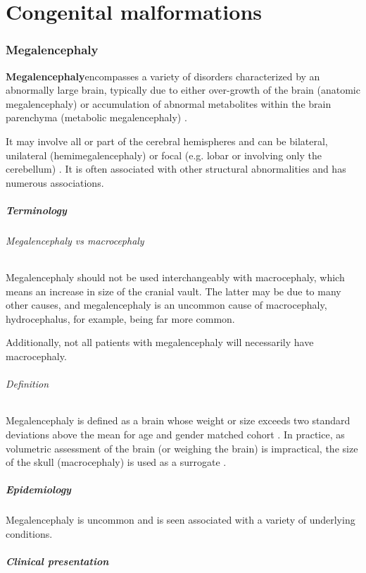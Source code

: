 \chapter{Congenital malformations}

\subsection{Megalencephaly}

\textbf{Megalencephaly}encompasses a variety of disorders characterized by an abnormally large brain, typically due to either over-growth of the brain (anatomic megalencephaly) or accumulation of abnormal metabolites within the brain parenchyma (metabolic megalencephaly) .

It may involve all or part of the cerebral hemispheres and can be bilateral, unilateral (hemimegalencephaly) or focal (e.g. lobar or involving only the cerebellum) . It is often associated with other structural abnormalities and has numerous associations.

\paragraph{Terminology}

\subparagraph{Megalencephaly vs macrocephaly}

Megalencephaly should not be used interchangeably with macrocephaly, which means an increase in size of the cranial vault. The latter may be due to many other causes, and megalencephaly is an uncommon cause of macrocephaly, hydrocephalus, for example, being far more common.

Additionally, not all patients with megalencephaly will necessarily have macrocephaly.

\subparagraph{Definition}

Megalencephaly is defined as a brain whose weight or size exceeds two standard deviations above the mean for age and gender matched cohort . In practice, as volumetric assessment of the brain (or weighing the brain) is impractical, the size of the skull (macrocephaly) is used as a surrogate .

\paragraph{Epidemiology}

Megalencephaly is uncommon and is seen associated with a variety of underlying conditions.

\paragraph{Clinical presentation}


